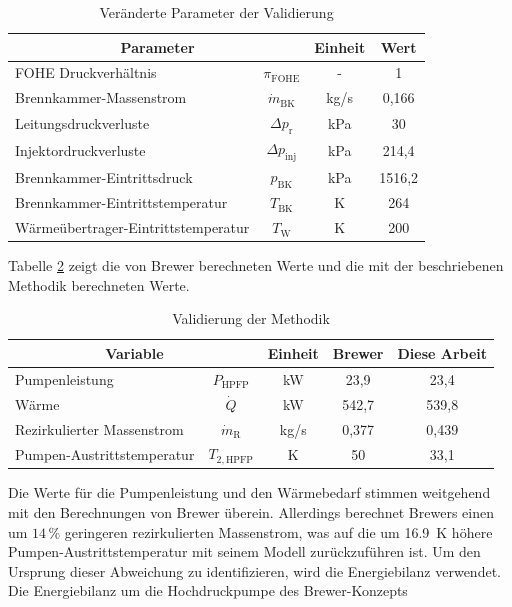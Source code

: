 \begin{table}[ht]
    \centering
	\caption{Veränderte Parameter der Validierung}
	\begin{tabular} {|l|c|c|c|} \hline%
    \multicolumn{2}{|c|}{Parameter} & Einheit & Wert\\ \hline\hline%
    FOHE Druckverhältnis & $\pi_\mathrm{FOHE}$ & - & 1 \\ \hline
    Brennkammer-Massenstrom & $\dot{m}_\mathrm{BK}$ & kg/s & 0,166 \\ \hline
    Leitungsdruckverluste & $\Delta p_\mathrm{r}$ & kPa & 30 \\ \hline
    Injektordruckverluste & $\Delta p_\mathrm{inj}$ & kPa & 214,4 \\ \hline
    Brennkammer-Eintrittsdruck & $p_\mathrm{BK}$ & kPa & 1516,2 \\ \hline
    Brennkammer-Eintrittstemperatur & $T_\mathrm{BK}$ & K & 264 \\ \hline
    Wärmeübertrager-Eintrittstemperatur & $T_\mathrm{W}$ & K & 200 \\ \hline
    \end{tabular}	
    \label{Tab:brewer}%
\end{table}
\FloatBarrier 

Tabelle \ref{Tab:validation} zeigt die von Brewer berechneten Werte und die mit der beschriebenen Methodik berechneten Werte. 

\begin{table}[ht]
    \centering
	\caption{Validierung der Methodik}
	\begin{tabular} {|l|c|c|c|c|} \hline%
    \multicolumn{2}{|c|}{Variable} & Einheit & Brewer \cite{Brewer.1991} & Diese Arbeit \\ \hline\hline%
    Pumpenleistung & $P_\mathrm{HPFP}$ & kW & 23,9 & 23,4 \\ \hline
    Wärme & $\dot{Q}$ & kW & 542,7 & 539,8 \\ \hline
    Rezirkulierter Massenstrom & $\dot{m}_\mathrm{R}$ & kg/s & 0,377 & 0,439 \\ \hline
    Pumpen-Austrittstemperatur & $T_{2,\mathrm{HPFP}}$ & K & 50 & 33,1 \\ \hline
    \end{tabular}	
    \label{Tab:validation}%
\end{table}
\FloatBarrier 

Die Werte für die Pumpenleistung und den Wärmebedarf stimmen weitgehend mit den Berechnungen von Brewer überein. Allerdings berechnet Brewers einen um $14\,\%$ geringeren rezirkulierten Massenstrom, was auf die um \SI{16.9}{\K} höhere Pumpen-Austrittstemperatur mit seinem Modell zurückzuführen ist. Um den Ursprung dieser Abweichung zu identifizieren, wird die Energiebilanz verwendet. Die Energiebilanz um die Hochdruckpumpe des Brewer-Konzepts 

